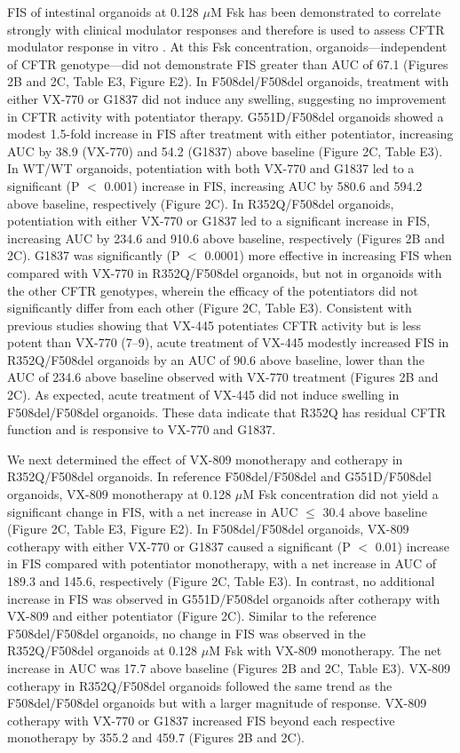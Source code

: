 FIS of intestinal organoids at 0.128 $\mu$M Fsk has been demonstrated to correlate strongly with clinical modulator responses and therefore is used to assess CFTR modulator response in vitro \cite{dekkers2016}. At this Fsk concentration, organoids—independent of CFTR genotype—did not demonstrate FIS greater than AUC of 67.1 (Figures 2B and 2C, Table E3, Figure E2). In F508del/F508del organoids, treatment with either VX-770 or G1837 did not induce any swelling, suggesting no improvement in CFTR activity with potentiator therapy. G551D/F508del organoids showed a modest 1.5-fold increase in FIS after treatment with either potentiator, increasing AUC by 38.9 (VX-770) and 54.2 (G1837) above baseline (Figure 2C, Table E3). In WT/WT organoids, potentiation with both VX-770 and G1837 led to a significant (P $<$ 0.001) increase in FIS, increasing AUC by 580.6 and 594.2 above baseline, respectively (Figure 2C). In R352Q/F508del organoids, potentiation with either VX-770 or G1837 led to a significant increase in FIS, increasing AUC by 234.6 and 910.6 above baseline, respectively (Figures 2B and 2C). G1837 was significantly (P $<$ 0.0001) more effective in increasing FIS when compared with VX-770 in R352Q/F508del organoids, but not in organoids with the other CFTR genotypes, wherein the efficacy of the potentiators did not significantly differ from each other (Figure 2C, Table E3). Consistent with previous studies showing that VX-445 potentiates CFTR activity but is less potent than VX-770 (7–9), acute treatment of VX-445 modestly increased FIS in R352Q/F508del organoids by an AUC of 90.6 above baseline, lower than the AUC of 234.6 above baseline observed with VX-770 treatment (Figures 2B and 2C). As expected, acute treatment of VX-445 did not induce swelling in F508del/F508del organoids. These data indicate that R352Q has residual CFTR function and is responsive to VX-770 and G1837.

We next determined the effect of VX-809 monotherapy and cotherapy in R352Q/F508del organoids. In reference F508del/F508del and G551D/F508del organoids, VX-809 monotherapy at 0.128 $\mu$M Fsk concentration did not yield a significant change in FIS, with a net increase in AUC $\leq$ 30.4 above baseline (Figure 2C, Table E3, Figure E2). In F508del/F508del organoids, VX-809 cotherapy with either VX-770 or G1837 caused a significant (P $<$ 0.01) increase in FIS compared with potentiator monotherapy, with a net increase in AUC of 189.3 and 145.6, respectively (Figure 2C, Table E3). In contrast, no additional increase in FIS was observed in G551D/F508del organoids after cotherapy with VX-809 and either potentiator (Figure 2C). Similar to the reference F508del/F508del organoids, no change in FIS was observed in the R352Q/F508del organoids at 0.128 $\mu$M Fsk with VX-809 monotherapy. The net increase in AUC was 17.7 above baseline (Figures 2B and 2C, Table E3). VX-809 cotherapy in R352Q/F508del organoids followed the same trend as the F508del/F508del organoids but with a larger magnitude of response. VX-809 cotherapy with VX-770 or G1837 increased FIS beyond each respective monotherapy by 355.2 and 459.7 (Figures 2B and 2C).

